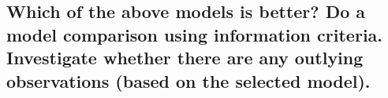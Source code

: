 \documentclass[12pt]{article}
\begin{document}




    








\subsection{Which of the above models is better? Do a model comparison using information criteria. Investigate whether there are any outlying observations (based on the selected model).}
\end{document}
